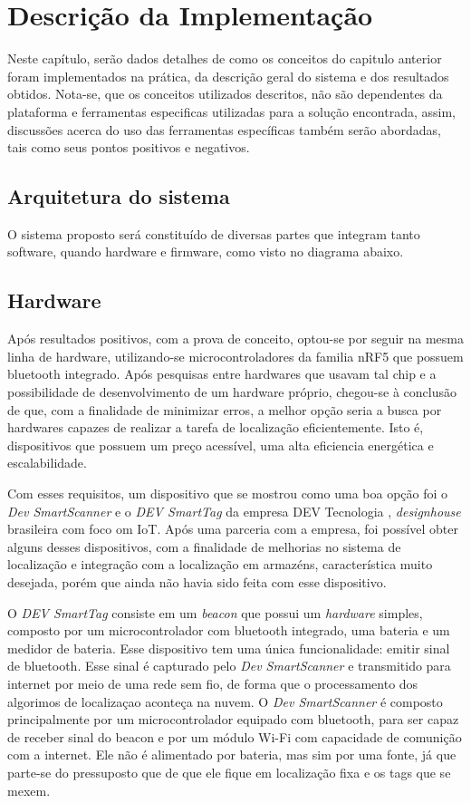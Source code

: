 \chapter{Descrição da Implementação}
Neste capítulo, serão dados detalhes de como os conceitos do capitulo anterior foram implementados na prática, da descrição geral do sistema e dos resultados obtidos.
Nota-se, que os conceitos utilizados descritos, não são dependentes da plataforma e ferramentas especificas utilizadas para a solução encontrada, assim, discussões acerca do uso das ferramentas específicas também serão abordadas, tais como seus pontos positivos e negativos.


\section{Arquitetura do sistema}
O sistema proposto será constituído de diversas partes que integram tanto software, quando hardware e firmware, como visto no diagrama abaixo.

\section{Hardware}
Após resultados positivos, com a prova de conceito, optou-se por seguir na mesma linha de hardware, utilizando-se microcontroladores da familia nRF5 que possuem bluetooth integrado. Após pesquisas entre hardwares que usavam tal chip e a possibilidade de desenvolvimento de um hardware próprio, chegou-se à conclusão de que, com a finalidade de minimizar erros, a melhor opção seria a busca por hardwares capazes de realizar a tarefa de localização eficientemente. Isto é, dispositivos que possuem um preço acessível, uma alta eficiencia energética e escalabilidade.

Com esses requisitos, um dispositivo que se mostrou como uma boa opção foi o \textit{Dev SmartScanner} e o \textit{DEV SmartTag} da empresa DEV Tecnologia \cite{DEV_Site}, \textit{designhouse} brasileira com foco om IoT. Após uma parceria com a empresa, foi possível obter alguns desses dispositivos, com a finalidade de melhorias no sistema de localização e integração com a localização em armazéns, característica muito desejada, porém que ainda não havia sido feita com esse dispositivo.

O \textit{DEV SmartTag} consiste em um \textit{beacon} que possui um \textit{hardware} simples, composto por um microcontrolador com bluetooth integrado, uma bateria e um medidor de bateria. Esse dispositivo tem uma única funcionalidade: emitir sinal de bluetooth.
Esse sinal é capturado pelo \textit{Dev SmartScanner} e transmitido para internet por meio de uma rede sem fio, de forma que o processamento dos algorimos de localizaçao aconteça na nuvem. O \textit{Dev SmartScanner} é composto principalmente por um microcontrolador equipado com bluetooth, para ser capaz de receber sinal do beacon e por um módulo Wi-Fi com capacidade de comunição com a internet. Ele não é alimentado por bateria, mas sim por uma fonte, já que  parte-se do pressuposto que de que ele fique em localização fixa e os tags que se mexem.

